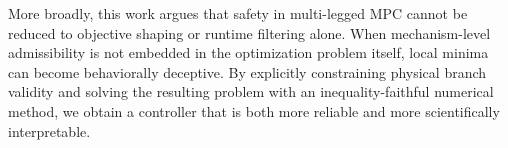 More broadly, this work argues that safety in multi-legged MPC cannot be reduced to objective shaping or runtime filtering alone. When mechanism-level admissibility is not embedded in the optimization problem itself, local minima can become behaviorally deceptive. By explicitly constraining physical branch validity and solving the resulting problem with an inequality-faithful numerical method, we obtain a controller that is both more reliable and more scientifically interpretable.
